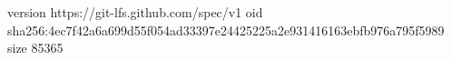version https://git-lfs.github.com/spec/v1
oid sha256:4ec7f42a6a699d55f054ad33397e24425225a2e931416163ebfb976a795f5989
size 85365
